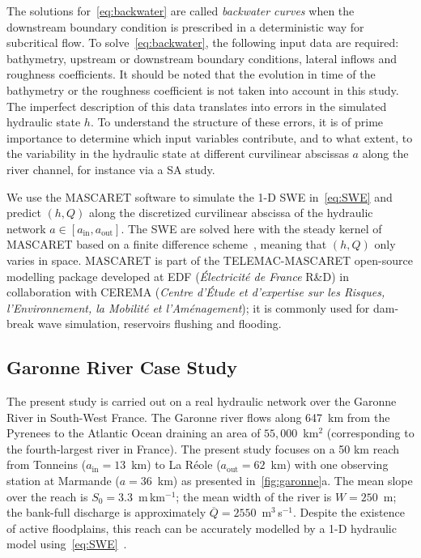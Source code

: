 The solutions for~\cref{eq:backwater} are called {\it backwater curves} when the downstream boundary condition is prescribed in a deterministic way for subcritical flow. To solve~\cref{eq:backwater}, the following input data are required: bathymetry, upstream or downstream boundary conditions, lateral inflows and roughness coefficients. It should be noted that the evolution in time of the bathymetry or the roughness coefficient is not taken into account in this study. The imperfect description of this data translates into errors in the simulated hydraulic state $h$. To understand the structure of these errors, it is of prime importance to determine which input variables contribute, and to what extent, to the variability in the hydraulic state at different curvilinear abscissas $a$ along the river channel, for instance via a SA study.

We use the MASCARET software to simulate the 1-D SWE in~\cref{eq:SWE} and predict $(h, Q)$ along the discretized curvilinear abscissa of the hydraulic network $a \in [a_{\text{in}}, a_{\text{out}}]$. The SWE are solved here with the steady kernel of MASCARET based on a finite difference scheme~\citep{goutal2002,goutal2012}, meaning that $(h,Q)$ only varies in space. MASCARET is part of the TELEMAC-MASCARET open-source modelling package developed at EDF (\textit{Électricité de France} R\&D) in collaboration with CEREMA (\textit{Centre d'Étude et d'expertise sur les Risques, l'Environnement, la Mobilité et l'Aménagement}); it is commonly used for dam-break wave simulation, reservoirs flushing and flooding. 

\subsection{Garonne River Case Study}

The present study is carried out on a real hydraulic network over the Garonne River in South-West France. The Garonne river flows along 647~km from the Pyrenees to the Atlantic Ocean draining an area of $55,000$~km$^2$ (corresponding to the fourth-largest river in France). The present study focuses on a 50 km reach from Tonneins ($a_{\text{in}} = 13$~km) to La Réole ($a_{\text{out}} = 62$~km) with one observing station at Marmande ($a = 36$~km) as presented in~\cref{fig:garonne}a. The mean slope over the reach is $S_0 = 3.3$~m\,km$^{-1}$; the mean width of the river is $W = 250$~m; the bank-full discharge is approximately $\overline{Q} = 2550$~m$^3$\,s$^{-1}$. Despite the existence of active floodplains, this reach can be accurately modelled by a 1-D hydraulic model using~\cref{eq:SWE}~\citep{besnard2011}.

